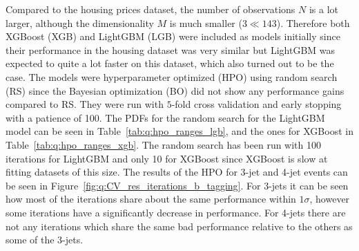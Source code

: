 Compared to the housing prices dataset, the number of observations $N$ is a lot larger, although the dimensionality $M$ is much smaller ($3 \ll 143 $). Therefore both XGBoost (XGB) and LightGBM (LGB) were included as models initially since their performance in the housing dataset was very similar but LightGBM was expected to quite a lot faster on this dataset, which also turned out to be the case. The models were hyperparameter optimized (HPO) using random search (RS) since the Bayesian optimization (BO) did not show any performance gains compared to RS. They were run with $5$-fold cross validation and early stopping with a patience of \num{100}. The PDFs for the random search for the LightGBM model can be seen in Table~\ref{tab:q:hpo_ranges_lgb}, and the ones for XGBoost in Table~\ref{tab:q:hpo_ranges_xgb}. The random search has been run with \num{100} iterations for LightGBM and only \num{10} for XGBoost since XGBoost is slow at fitting datasets of this size. The results of the HPO for 3-jet and 4-jet events can be seen in Figure~\ref{fig:q:CV_res_iterations_b_tagging}. For 3-jets it can be seen how most of the iterations share about the same performance within $1\sigma$, however some iterations have a significantly decrease in performance. For 4-jets there are not any iterations which share the same bad performance relative to the others as some of the 3-jets. 

